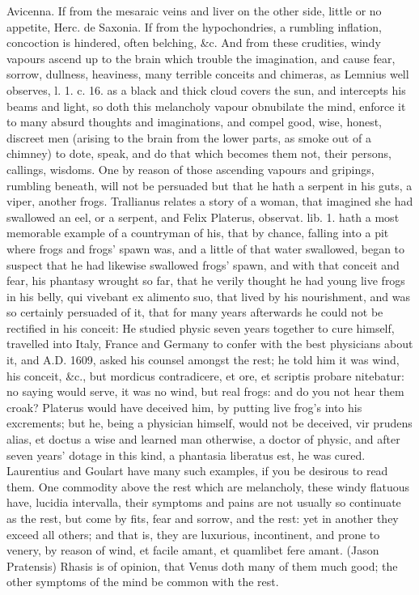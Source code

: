 {Avicenna. If from the mesaraic veins and liver on the other side,
little or no appetite, Herc. de Saxonia. If from the hypochondries, a
rumbling inflation, concoction is hindered, often belching, \&c. And
from these crudities, windy vapours ascend up to the brain which
trouble the imagination, and cause fear, sorrow, dullness, heaviness,
many terrible conceits and chimeras, as Lemnius well observes, l. 1. c.
16. as a black and thick cloud covers the sun, and intercepts his
beams and light, so doth this melancholy vapour obnubilate the mind,
enforce it to many absurd thoughts and imaginations, and compel good,
wise, honest, discreet men (arising to the brain from the  lower
parts, as smoke out of a chimney) to dote, speak, and do that which
becomes them not, their persons, callings, wisdoms. One by reason of
those ascending vapours and gripings, rumbling beneath, will not be
persuaded but that he hath a serpent in his guts, a viper, another
frogs. Trallianus relates a story of a woman, that imagined she had
swallowed an eel, or a serpent, and Felix Platerus, observat. lib. 1.
hath a most memorable example of a countryman of his, that by chance,
falling into a pit where frogs and frogs' spawn was, and a little of
that water swallowed, began to suspect that he had likewise swallowed
frogs' spawn, and with that conceit and fear, his phantasy wrought so
far, that he verily thought he had young live frogs in his belly, qui
vivebant ex alimento suo, that lived by his nourishment, and was so
certainly persuaded of it, that for many years afterwards he could not
be rectified in his conceit: He studied physic seven years together to
cure himself, travelled into Italy, France and Germany to confer with
the best physicians about it, and A.D. 1609, asked his counsel amongst
the rest; he told him it was wind, his conceit, \&c., but mordicus
contradicere, et ore, et scriptis probare nitebatur: no saying would
serve, it was no wind, but real frogs: and do you not hear them croak?
Platerus would have deceived him, by putting live frog's into his
excrements; but he, being a physician himself, would not be deceived,
vir prudens alias, et doctus a wise and learned man otherwise, a doctor
of physic, and after seven years' dotage in this kind, a phantasia
liberatus est, he was cured. Laurentius and Goulart have many such
examples, if you be desirous to read them. One commodity above the rest
which are melancholy, these windy flatuous have, lucidia intervalla,
their symptoms and pains are not usually so continuate as the rest, but
come by fits, fear and sorrow, and the rest: yet in another they exceed
all others; and that is, they are luxurious, incontinent, and
prone to venery, by reason of wind, et facile amant, et quamlibet fere
amant. (Jason Pratensis) Rhasis is of opinion, that Venus doth
many of them much good; the other symptoms of the mind be common with
the rest.

}
